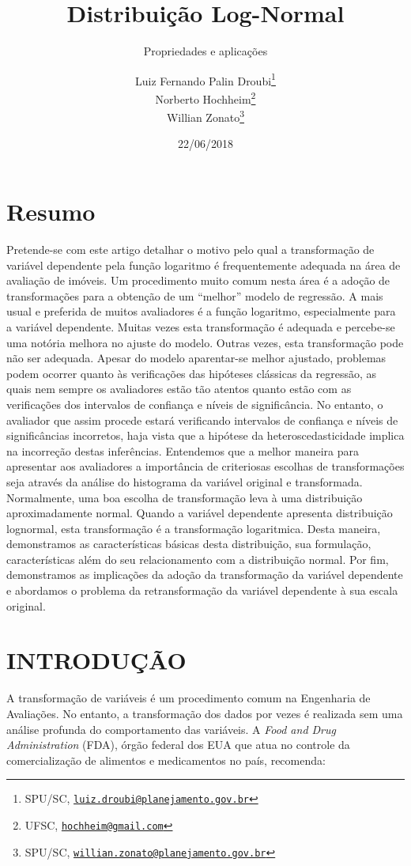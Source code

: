 \documentclass[a4paper]{article}
\title{Distribuição Log-Normal}
\subtitle{Propriedades e aplicações}
\author{Luiz Fernando Palin Droubi\footnote{SPU/SC,
  \href{mailto:luiz.droubi@planejamento.gov.br}{\nolinkurl{luiz.droubi@planejamento.gov.br}}} \\ Norberto Hochheim\footnote{UFSC,
  \href{mailto:hochheim@gmail.com}{\nolinkurl{hochheim@gmail.com}}} \\ Willian Zonato\footnote{SPU/SC,
  \href{mailto:willian.zonato@planejamento.gov.br}{\nolinkurl{willian.zonato@planejamento.gov.br}}}}
\date{22/06/2018}
\begin{document}
\maketitle

\section*{Resumo}\label{resumo}

Pretende-se com este artigo detalhar o motivo pelo qual a transformação
de variável dependente pela função logaritmo é frequentemente adequada
na área de avaliação de imóveis. Um procedimento muito comum nesta área
é a adoção de transformações para a obtenção de um ``melhor'' modelo de
regressão. A mais usual e preferida de muitos avaliadores é a função
logaritmo, especialmente para a variável dependente. Muitas vezes esta
transformação é adequada e percebe-se uma notória melhora no ajuste do
modelo. Outras vezes, esta transformação pode não ser adequada. Apesar
do modelo aparentar-se melhor ajustado, problemas podem ocorrer quanto
às verificações das hipóteses clássicas da regressão, as quais nem
sempre os avaliadores estão tão atentos quanto estão com as verificações
dos intervalos de confiança e níveis de significância. No entanto, o
avaliador que assim procede estará verificando intervalos de confiança e
níveis de significâncias incorretos, haja vista que a hipótese da
heteroscedasticidade implica na incorreção destas inferências.
Entendemos que a melhor maneira para apresentar aos avaliadores a
importância de criteriosas escolhas de transformações seja através da
análise do histograma da variável original e transformada. Normalmente,
uma boa escolha de transformação leva à uma distribuição aproximadamente
normal. Quando a variável dependente apresenta distribuição lognormal,
esta transformação é a transformação logaritmica. Desta maneira,
demonstramos as características básicas desta distribuição, sua
formulação, características além do seu relacionamento com a
distribuição normal. Por fim, demonstramos as implicações da adoção da
transformação da variável dependente e abordamos o problema da
retransformação da variável dependente à sua escala original.

\section{INTRODUÇÃO}\label{introducao}

A transformação de variáveis é um procedimento comum na Engenharia de
Avaliações. No entanto, a transformação dos dados por vezes é realizada
sem uma análise profunda do comportamento das variáveis. A \emph{Food
and Drug Administration} (FDA), órgão federal dos EUA que atua no
controle da comercialização de alimentos e medicamentos no país,
recomenda:
\end{document}
